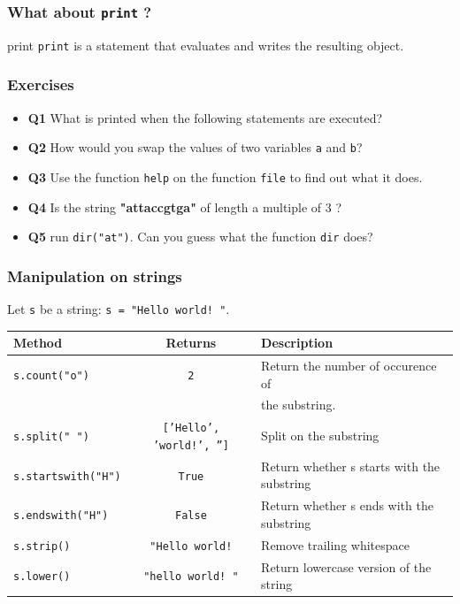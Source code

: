 \documentclass[xcolor=dvipsnames]{beamer}
\begin{document}
\begin{frame}
\frametitle{What about \texttt{print} ?}

\begin{block}{print}
\texttt{print} is a statement that evaluates and writes the resulting object.
\end{block}



\end{frame}

\begin{frame}
\frametitle{Exercises}
\begin{itemize}
\item \textbf{Q1} What is printed when the following statements are executed?

\item \textbf{Q2} How would you swap the values of two variables \texttt{a}
and \texttt{b}?
\item \textbf{Q3} Use the function \texttt{help} on the function \texttt{file}
to find out what it does.
\item \textbf{Q4} Is the string \textbf{"attaccgtga"} of length a multiple of
3 ?
\item \textbf{Q5} run \texttt{dir("at")}. Can you guess what the function
\texttt{dir} does?
\end{itemize}
\end{frame}

\begin{frame}
\frametitle{Manipulation on strings}

Let \texttt{s} be a string: \texttt{s = "Hello world! "}.

\begin{table}
\scriptsize
\begin{tabular}{lcl}
Method & Returns & Description \\
\hline
\texttt{s.count("o")} & \texttt{2} & Return the number of occurence of \\
		      &		   & the substring. \\
\texttt{s.split(" ")} & {\tiny \texttt{['Hello', 'world!', '']}} & Split on the substring \\
\texttt{s.startswith("H")} & \texttt{True} & Return whether s starts with the
substring \\
\texttt{s.endswith("H")} & \texttt{False} & Return whether s ends with the
substring \\
\texttt{s.strip()} & \texttt{"Hello world!} & Remove trailing whitespace \\
\texttt{s.lower()} & \texttt{"hello world! "} & Return lowercase version of
the string \\
\end{tabular}
\end{table}

\vspace{1em}

\end{frame}
\end{document}
